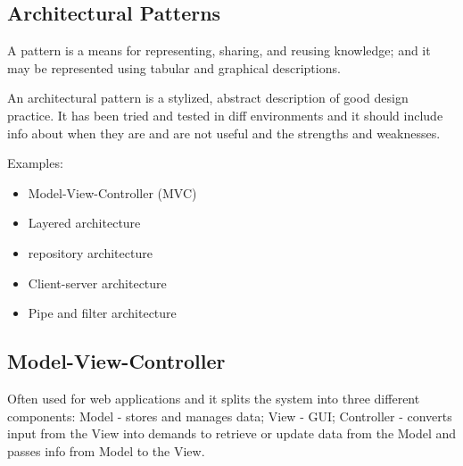 \documentclass{article}
\begin{document}
    \subsection*{Architectural Patterns}

    A pattern is a means for representing, sharing, and reusing knowledge; and it may be 
    represented using tabular and graphical descriptions.

    An architectural pattern is a stylized, abstract description of good design practice. 
    It has been tried and tested in diff environments and it should include info about 
    when they are and are not useful and the strengths and weaknesses.

    Examples:
    \begin{itemize}
        \item Model-View-Controller (MVC)
        \item Layered architecture 
        \item repository architecture 
        \item Client-server architecture 
        \item Pipe and filter architecture
    \end{itemize}

    \subsection*{Model-View-Controller}

    Often used for web applications and it splits the system into three different 
    components: Model - stores and manages data; View - GUI; Controller - 
    converts input from the View into demands to retrieve or update data from the 
    Model and passes info from Model to the View.
\end{document}
